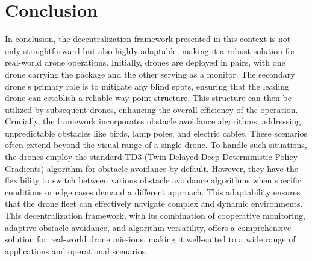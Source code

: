 \documentclass[preprint,12pt]{elsarticle}
\begin{document}
\section{Conclusion}

In conclusion, the decentralization framework presented in this context is not only straightforward but also highly adaptable, making it a robust solution for real-world drone operations. Initially, drones are deployed in pairs, with one drone carrying the package and the other serving as a monitor. The secondary drone's primary role is to mitigate any blind spots, ensuring that the leading drone can establish a reliable way-point structure. This structure can then be utilized by subsequent drones, enhancing the overall efficiency of the operation.\\

Crucially, the framework incorporates obstacle avoidance algorithms, addressing unpredictable obstacles like birds, lamp poles, and electric cables. These scenarios often extend beyond the visual range of a single drone. To handle such situations, the drones employ the standard TD3 (Twin Delayed Deep Deterministic Policy Gradients) algorithm for obstacle avoidance by default. However, they have the flexibility to switch between various obstacle avoidance algorithms when specific conditions or edge cases demand a different approach. This adaptability ensures that the drone fleet can effectively navigate complex and dynamic environments.\\

This decentralization framework, with its combination of cooperative monitoring, adaptive obstacle avoidance, and algorithm versatility, offers a comprehensive solution for real-world drone missions, making it well-suited to a wide range of applications and operational scenarios.\\
\end{document}
